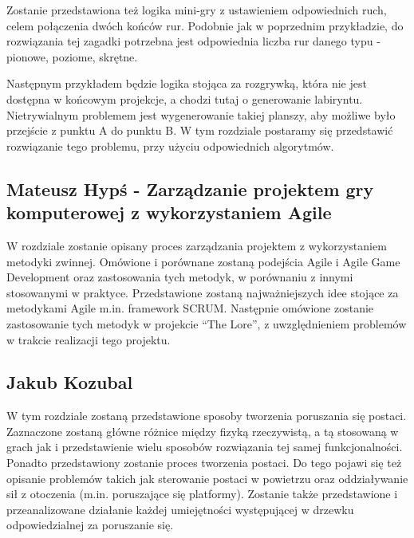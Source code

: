 \documentclass[oneside,polski,logo]{amuthesis}
\begin{document}
Zostanie przedstawiona też logika mini-gry z ustawieniem odpowiednich ruch, celem połączenia dwóch końców rur. Podobnie jak w poprzednim przykładzie, do rozwiązania tej zagadki potrzebna jest odpowiednia liczba rur danego typu - pionowe, poziome, skrętne. 

Następnym przykładem będzie logika stojąca za rozgrywką, która nie jest dostępna w końcowym projekcje, a chodzi tutaj o generowanie labiryntu. Nietrywialnym problemem jest wygenerowanie takiej planszy, aby możliwe było przejście z punktu A do punktu B. W tym rozdziale postaramy się przedstawić rozwiązanie tego problemu, przy użyciu odpowiednich algorytmów.

\subsection{Mateusz Hypś - Zarządzanie projektem gry komputerowej z wykorzystaniem Agile}
W rozdziale zostanie opisany proces zarządzania projektem z wykorzystaniem metodyki zwinnej. Omówione i porównane zostaną podejścia Agile i Agile Game Development oraz zastosowania tych metodyk, w porównaniu z innymi stosowanymi w praktyce. Przedstawione zostaną najważniejszych idee stojące za metodykami Agile m.in. framework SCRUM. Następnie omówione zostanie zastosowanie tych metodyk w projekcie “The Lore”, z uwzględnieniem problemów w trakcie realizacji tego projektu. 
\subsection{Jakub Kozubal}
W tym rozdziale zostaną przedstawione sposoby tworzenia poruszania się postaci. Zaznaczone zostaną główne różnice między fizyką rzeczywistą, a tą stosowaną w grach jak i przedstawienie wielu sposobów rozwiązania tej samej funkcjonalności. Ponadto przedstawiony zostanie proces tworzenia postaci. Do tego pojawi się też opisanie problemów takich jak sterowanie postaci w powietrzu oraz oddziaływanie sił z otoczenia (m.in. poruszające się platformy). Zostanie także przedstawione i przeanalizowane działanie każdej umiejętności występującej w drzewku odpowiedzialnej za poruszanie się.
\end{document}
